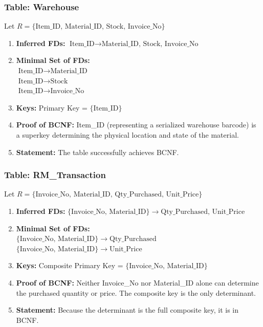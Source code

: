 \documentclass[12pt, a4paper]{article}
\begin{document}
\subsubsection{Table: Warehouse}
Let $R = \{ \text{Item\_ID, Material\_ID, Stock, Invoice\_No} \}$
\begin{enumerate}
    \item[(a)] \textbf{Inferred FDs:} $\text{Item\_ID} \rightarrow \text{Material\_ID, Stock, Invoice\_No}$
    \item[(b)] \textbf{Minimal Set of FDs:} 
    \\ $\text{Item\_ID} \rightarrow \text{Material\_ID}$
    \\ $\text{Item\_ID} \rightarrow \text{Stock}$
    \\ $\text{Item\_ID} \rightarrow \text{Invoice\_No}$
    \item[(c)] \textbf{Keys:} Primary Key = $\{ \text{Item\_ID} \}$
    \item[(d)] \textbf{Proof of BCNF:} Item\_ID (representing a serialized warehouse barcode) is a superkey determining the physical location and state of the material.
    \item[(e)] \textbf{Statement:} The table successfully achieves BCNF.
\end{enumerate}

\subsubsection{Table: RM\_Transaction}
Let $R = \{ \text{Invoice\_No, Material\_ID, Qty\_Purchased, Unit\_Price} \}$
\begin{enumerate}
    \item[(a)] \textbf{Inferred FDs:} $\{ \text{Invoice\_No, Material\_ID} \} \rightarrow \text{Qty\_Purchased, Unit\_Price}$
    \item[(b)] \textbf{Minimal Set of FDs:} 
    \\ $\{ \text{Invoice\_No, Material\_ID} \} \rightarrow \text{Qty\_Purchased}$
    \\ $\{ \text{Invoice\_No, Material\_ID} \} \rightarrow \text{Unit\_Price}$
    \item[(c)] \textbf{Keys:} Composite Primary Key = $\{ \text{Invoice\_No, Material\_ID} \}$
    \item[(d)] \textbf{Proof of BCNF:} Neither Invoice\_No nor Material\_ID alone can determine the purchased quantity or price. The composite key is the only determinant.
    \item[(e)] \textbf{Statement:} Because the determinant is the full composite key, it is in BCNF.
\end{enumerate}
\end{document}
